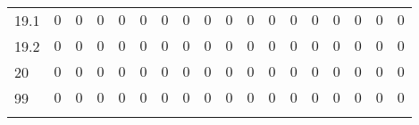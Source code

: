 \begin{table}[!htbp]
\begin{tabularx}{\textwidth}{XXXXXXXXXXXXXXXXXX}
19.1 & $0$ & $0$ & $0$ & $0$ & $0$ & $0$ & $0$ & $0$ & $0$ & $0$ & $0$ & $0$ & $0$ & $0$ & $0$ & $0$ & $0$ \\ 
19.2 & $0$ & $0$ & $0$ & $0$ & $0$ & $0$ & $0$ & $0$ & $0$ & $0$ & $0$ & $0$ & $0$ & $0$ & $0$ & $0$ & $0$ \\ 
20 & $0$ & $0$ & $0$ & $0$ & $0$ & $0$ & $0$ & $0$ & $0$ & $0$ & $0$ & $0$ & $0$ & $0$ & $0$ & $0$ & $0$ \\ 
99 & $0$ & $0$ & $0$ & $0$ & $0$ & $0$ & $0$ & $0$ & $0$ & $0$ & $0$ & $0$ & $0$ & $0$ & $0$ & $0$ & $0$ \\ 
\hline \\[-1.8ex] 
\end{tabularx} 
\end{table} 
